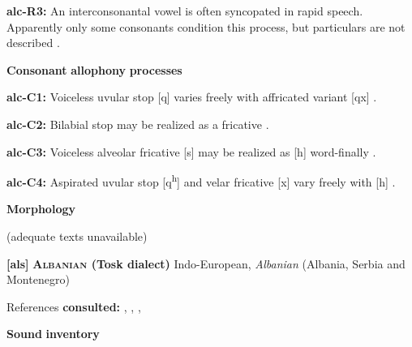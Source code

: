 \documentclass[output=paper]{langsci/langscibook}
\begin{document}
\begin{styleBody}
\textbf{alc-R3:} An interconsonantal vowel is often syncopated in rapid speech. Apparently only some consonants condition this process, but particulars are not described \citep[393]{Clairis1985}.
\end{styleBody}

\begin{styleBody}
\textbf{Consonant} \textbf{allophony} \textbf{processes}
\end{styleBody}

\begin{styleBody}
\textbf{alc-C1:} Voiceless uvular stop [q] varies freely with affricated variant [qx] \citep[378]{Clairis1985}.
\end{styleBody}

\begin{styleBody}
\textbf{alc-C2:}  Bilabial stop may be realized as a fricative \citep{Aguilera2001}.
\end{styleBody}

\begin{styleBody}
\textbf{alc-C3:} Voiceless alveolar fricative [s] may be realized as [h] word-finally \citep[372]{Clairis1985}.
\end{styleBody}

\begin{styleBody}
\textbf{alc-C4:} Aspirated uvular stop [q\textsuperscript{h}] and velar fricative [x] vary freely with [h] \citep[377-8]{Clairis1985}.
\end{styleBody}

\begin{styleBody}
\textbf{Morphology}
\end{styleBody}

\begin{styleBody}
(adequate texts unavailable)
\end{styleBody}

\begin{styleBody}
\textbf{[als]}   \textbf{\textsc{Albanian} \textbf{(Tosk} \textbf{dialect)}}  Indo-European, \textit{Albanian} (Albania, Serbia and Montenegro)
\end{styleBody}

\begin{styleBody}
References \textbf{consulted:} \citet{Bevington1974}, \citet{Klippenstein2010}, \citet{Newmark1957}, \citet{NewmarkEtAl1982}
\end{styleBody}

\begin{styleBody}
\textbf{Sound} \textbf{inventory}
\end{styleBody}
\end{document}
